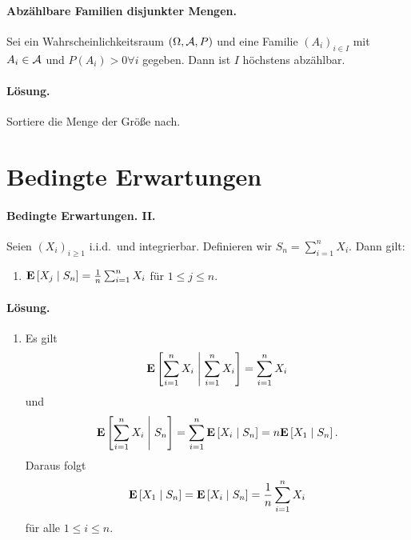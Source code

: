 \paragraph{Abzählbare Familien disjunkter Mengen.} Sei ein Wahrscheinlichkeitsraum
$(\Omega, \mathcal A, P)$ und eine Familie $(A_i)_{i\in I}$ mit $A_i \in \mathcal A$ und
$P(A_i)>0 \forall i$ gegeben. Dann ist $I$ höchstens abzählbar. 
\paragraph*{Lösung.} Sortiere die Menge der Größe nach. 



\section{Bedingte Erwartungen}



\paragraph{Bedingte Erwartungen. II.}
Seien $\left( X_i \right)_{i\geq 1}$ i.i.d.\ und integrierbar. Definieren wir 
$S_n = \sum_{i=1}^{n} X_i$. Dann gilt:
\begin{enumerate}
    \item $\mathbf{E} \left[ X_j \;\middle\vert\; S_n \right] = \frac{1}{n} \sum_{i=1}^{n} X_i$
        für $1\leq j \leq n$.
\end{enumerate}

\paragraph*{Lösung.} 
\begin{enumerate}
    \item Es gilt
        \begin{equation*}
            \mathbf{E} \left[ \sum_{i=1}^{n} X_i \;\middle\vert\; \sum_{i=1}^{n} X_i \right] 
            = \sum_{i=1}^{n} X_i
        \end{equation*}
        und
        \begin{equation*}
            \mathbf{E} \left[  \sum_{i=1}^{n} X_i \;\middle\vert\; S_n \right] =
            \sum_{i=1}^{n} \mathbf{E} \left[ X_i \;\middle\vert\; S_n \right] = 
            n \mathbf{E} \left[ X_1 \;\middle\vert\; S_n \right].
        \end{equation*}
        Daraus folgt
        \begin{equation*}
             \mathbf{E} \left[ X_1 \;\middle\vert\; S_n \right] = \mathbf{E} \left[ X_i \;\middle\vert\; S_n \right] =
             \frac{1}{n} \sum_{i=1}^{n} X_i
        \end{equation*}
        für alle $1 \leq i \leq n$. 
\end{enumerate}

